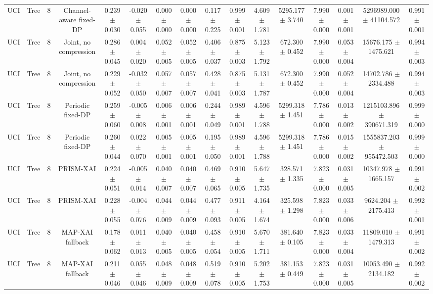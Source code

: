 \begin{tabular}{lccccccccccccccc}
UCI & Tree & 8 & Channel-aware fixed-DP & 0.239 $\pm$ 0.030 & -0.020 $\pm$ 0.055 & 0.000 $\pm$ 0.000 & 0.000 $\pm$ 0.000 & 0.117 $\pm$ 0.225 & 0.999 $\pm$ 0.001 & 4.609 $\pm$ 1.781 & 5295.177 $\pm$ 3.740 & 7.990 $\pm$ 0.000 & 0.001 $\pm$ 0.001 & 5296989.000 $\pm$ 41104.572 & 0.991 $\pm$ 0.001 \\
UCI & Tree & 8 & Joint, no compression & 0.286 $\pm$ 0.045 & 0.004 $\pm$ 0.020 & 0.052 $\pm$ 0.005 & 0.052 $\pm$ 0.005 & 0.406 $\pm$ 0.037 & 0.875 $\pm$ 0.003 & 5.123 $\pm$ 1.792 & 672.300 $\pm$ 0.452 & 7.990 $\pm$ 0.000 & 0.053 $\pm$ 0.004 & 15676.175 $\pm$ 1475.621 & 0.994 $\pm$ 0.003 \\
UCI & Tree & 8 & Joint, no compression & 0.229 $\pm$ 0.052 & -0.032 $\pm$ 0.050 & 0.057 $\pm$ 0.007 & 0.057 $\pm$ 0.007 & 0.428 $\pm$ 0.041 & 0.875 $\pm$ 0.003 & 5.131 $\pm$ 1.787 & 672.300 $\pm$ 0.452 & 7.990 $\pm$ 0.000 & 0.052 $\pm$ 0.004 & 14702.786 $\pm$ 2334.488 & 0.994 $\pm$ 0.003 \\
UCI & Tree & 8 & Periodic fixed-DP & 0.259 $\pm$ 0.060 & -0.005 $\pm$ 0.008 & 0.006 $\pm$ 0.001 & 0.006 $\pm$ 0.001 & 0.244 $\pm$ 0.049 & 0.989 $\pm$ 0.001 & 4.596 $\pm$ 1.788 & 5299.318 $\pm$ 1.451 & 7.786 $\pm$ 0.000 & 0.013 $\pm$ 0.002 & 1215103.896 $\pm$ 390671.319 & 0.999 $\pm$ 0.000 \\
UCI & Tree & 8 & Periodic fixed-DP & 0.260 $\pm$ 0.044 & 0.022 $\pm$ 0.070 & 0.005 $\pm$ 0.001 & 0.005 $\pm$ 0.001 & 0.195 $\pm$ 0.050 & 0.989 $\pm$ 0.001 & 4.596 $\pm$ 1.788 & 5299.318 $\pm$ 1.451 & 7.786 $\pm$ 0.000 & 0.015 $\pm$ 0.002 & 1555837.203 $\pm$ 955472.503 & 0.999 $\pm$ 0.000 \\
UCI & Tree & 8 & PRISM-XAI & 0.224 $\pm$ 0.051 & -0.005 $\pm$ 0.014 & 0.040 $\pm$ 0.007 & 0.040 $\pm$ 0.007 & 0.469 $\pm$ 0.065 & 0.910 $\pm$ 0.005 & 5.647 $\pm$ 1.735 & 328.571 $\pm$ 1.335 & 7.823 $\pm$ 0.000 & 0.031 $\pm$ 0.005 & 10347.978 $\pm$ 1665.157 & 0.991 $\pm$ 0.002 \\
UCI & Tree & 8 & PRISM-XAI & 0.228 $\pm$ 0.055 & -0.004 $\pm$ 0.076 & 0.044 $\pm$ 0.009 & 0.044 $\pm$ 0.009 & 0.477 $\pm$ 0.093 & 0.911 $\pm$ 0.005 & 4.164 $\pm$ 1.674 & 325.598 $\pm$ 1.298 & 7.823 $\pm$ 0.000 & 0.033 $\pm$ 0.006 & 9624.204 $\pm$ 2175.413 & 0.992 $\pm$ 0.001 \\
UCI & Tree & 8 & MAP-XAI fallback & 0.178 $\pm$ 0.062 & 0.011 $\pm$ 0.013 & 0.040 $\pm$ 0.005 & 0.040 $\pm$ 0.005 & 0.458 $\pm$ 0.054 & 0.910 $\pm$ 0.005 & 5.670 $\pm$ 1.711 & 381.640 $\pm$ 0.105 & 7.823 $\pm$ 0.000 & 0.033 $\pm$ 0.004 & 11809.010 $\pm$ 1479.313 & 0.991 $\pm$ 0.002 \\
UCI & Tree & 8 & MAP-XAI fallback & 0.211 $\pm$ 0.046 & 0.055 $\pm$ 0.046 & 0.048 $\pm$ 0.009 & 0.048 $\pm$ 0.009 & 0.519 $\pm$ 0.078 & 0.910 $\pm$ 0.005 & 5.202 $\pm$ 1.753 & 381.153 $\pm$ 0.449 & 7.823 $\pm$ 0.000 & 0.031 $\pm$ 0.005 & 10053.490 $\pm$ 2134.182 & 0.992 $\pm$ 0.002 \\
\bottomrule
\end{tabular}
